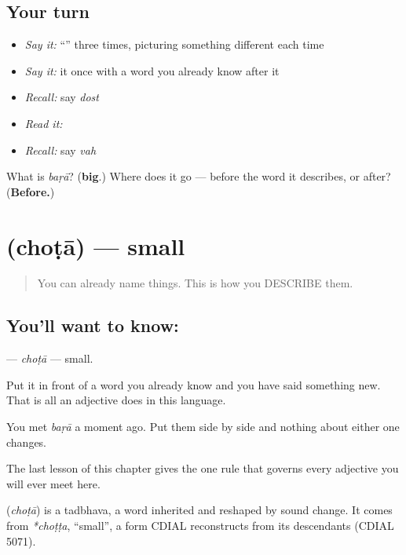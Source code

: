 \subsection*{Your turn}
\begin{itemize}
\raggedright
  \item \emph{Say it:} \textquotedblleft{}\textquotedblright{} three times, picturing something different each time
  \item \emph{Say it:} it once with a word you already know after it
  \item \emph{Recall:} say \emph{dost}
  \item \emph{Read it:} \textbf{}
  \item \emph{Recall:} say \emph{vah}
\end{itemize}

\begin{tcolorbox}[breakable,colback=teal!4,colframe=teal!35!black,title={Before you move on}]
What is \emph{baṛā}? (\textbf{big}.) Where does it go — before the word it describes, or after? (\textbf{Before.})
\end{tcolorbox}
\section[\texorpdfstring{\hi{छोटा} (choṭā)}{छोटा (choṭā)}]{ (choṭā) — small}

\label{lesson:HI-C41-small}



\begin{quote}
You can already name things. This is how you DESCRIBE them.
\end{quote}

\subsection*{You'll want to know: }
\textbf{} — \emph{choṭā} — small.

Put it in front of a word you already know and you have said something new. That is all an adjective does in this language.

You met \textbf{} \emph{baṛā} a moment ago. Put them side by side and nothing about either one changes.

The last lesson of this chapter gives the one rule that governs every adjective you will ever meet here.

\begin{cousinweb}
\textbf{} (\emph{choṭā}) is a tadbhava, a word inherited and reshaped by sound change. It comes from \emph{*choṭṭa}, \textquotedblleft{}small\textquotedblright{}, a form CDIAL reconstructs from its descendants (CDIAL 5071).
\end{cousinweb}


